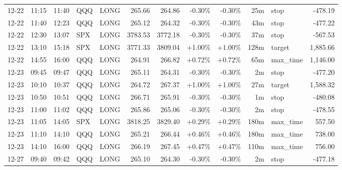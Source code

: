 \documentclass[11pt,a4paper,twoside]{article}
\begin{document}
\begin{center}
\begin{longtable}{>{\color{txtmain}}l l l l l r r r r r >{\color{txtmain}}l r}
12-22 & 11:15 & 11:40 & QQQ & LONG & 265.66 & 264.86 & \textcolor{lossred}{-0.30\%} & \textcolor{lossred}{-0.30\%} & 25m & stop & \textcolor{lossred}{-478.19} \\
12-22 & 11:40 & 12:23 & QQQ & LONG & 265.12 & 264.32 & \textcolor{lossred}{-0.30\%} & \textcolor{lossred}{-0.30\%} & 43m & stop & \textcolor{lossred}{-477.22} \\
12-22 & 12:30 & 13:07 & SPX & LONG & 3783.53 & 3772.18 & \textcolor{lossred}{-0.30\%} & \textcolor{lossred}{-0.30\%} & 37m & stop & \textcolor{lossred}{-567.53} \\
12-22 & 13:10 & 15:18 & SPX & LONG & 3771.33 & 3809.04 & \textcolor{wingreen}{+1.00\%} & \textcolor{wingreen}{+1.00\%} & 128m & target & \textcolor{wingreen}{1,885.66} \\
12-22 & 14:55 & 16:00 & QQQ & LONG & 264.91 & 266.82 & \textcolor{wingreen}{+0.72\%} & \textcolor{wingreen}{+0.72\%} & 65m & max\_time & \textcolor{wingreen}{1,146.00} \\
12-23 & 09:45 & 09:47 & QQQ & LONG & 265.11 & 264.31 & \textcolor{lossred}{-0.30\%} & \textcolor{lossred}{-0.30\%} & 2m & stop & \textcolor{lossred}{-477.20} \\
12-23 & 10:10 & 10:37 & QQQ & LONG & 264.72 & 267.37 & \textcolor{wingreen}{+1.00\%} & \textcolor{wingreen}{+1.00\%} & 27m & target & \textcolor{wingreen}{1,588.32} \\
12-23 & 10:50 & 10:51 & QQQ & LONG & 266.71 & 265.91 & \textcolor{lossred}{-0.30\%} & \textcolor{lossred}{-0.30\%} & 1m & stop & \textcolor{lossred}{-480.08} \\
12-23 & 11:00 & 11:02 & QQQ & LONG & 265.86 & 265.06 & \textcolor{lossred}{-0.30\%} & \textcolor{lossred}{-0.30\%} & 2m & stop & \textcolor{lossred}{-478.55} \\
12-23 & 11:05 & 14:05 & SPX & LONG & 3818.25 & 3829.40 & \textcolor{wingreen}{+0.29\%} & \textcolor{wingreen}{+0.29\%} & 180m & max\_time & \textcolor{wingreen}{557.50} \\
12-23 & 11:10 & 14:10 & QQQ & LONG & 265.21 & 266.44 & \textcolor{wingreen}{+0.46\%} & \textcolor{wingreen}{+0.46\%} & 180m & max\_time & \textcolor{wingreen}{738.00} \\
12-23 & 14:10 & 16:00 & QQQ & LONG & 266.19 & 267.45 & \textcolor{wingreen}{+0.47\%} & \textcolor{wingreen}{+0.47\%} & 110m & max\_time & \textcolor{wingreen}{756.00} \\
12-27 & 09:40 & 09:42 & QQQ & LONG & 265.10 & 264.30 & \textcolor{lossred}{-0.30\%} & \textcolor{lossred}{-0.30\%} & 2m & stop & \textcolor{lossred}{-477.18} \\

\end{longtable}
\end{center}
\end{document}
